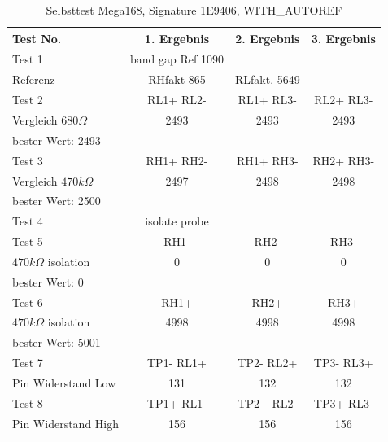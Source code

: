 \begin{table}[H]
  \begin{center}
    \begin{tabular}{| l | c | c | c |}
    \hline
Test No. & 1. Ergebnis & 2. Ergebnis & 3. Ergebnis \\
    \hline
    \hline
Test 1 & band gap Ref  1090 &  & \\
Referenz  & RHfakt 865 & RLfakt.  5649 &  \\
    \hline
Test 2 & RL1+ RL2- & RL1+ RL3- & RL2+ RL3- \\
Vergleich \(680\Omega\) & 2493 & 2493 & 2493 \\
bester Wert: 2493 & & & \\
    \hline
Test 3 & RH1+ RH2- & RH1+ RH3- & RH2+ RH3- \\
Vergleich \(470k\Omega\) & 2497 & 2498 & 2498 \\
bester Wert: 2500 & & & \\
    \hline
Test 4 & isolate probe & & \\
    \hline
Test 5 & RH1- &  RH2- & RH3- \\
\(470k\Omega\) isolation & 0 & 0 & 0 \\
bester Wert: 0 & & & \\
    \hline
Test 6 & RH1+ & RH2+ & RH3+ \\
\(470k\Omega\) isolation & 4998 & 4998 & 4998 \\
bester Wert: 5001 & & & \\
    \hline
Test 7 & TP1- RL1+ & TP2- RL2+ & TP3- RL3+ \\
Pin Widerstand Low & 131 & 132 & 132 \\
    \hline
Test 8 & TP1+ RL1- & TP2+ RL2- & TP3+ RL3- \\
Pin Widerstand High & 156 & 156 & 156 \\
    \hline
    \end{tabular}
  \end{center}
  \caption{Selbsttest Mega168, Signature 1E9406, WITH\_AUTOREF}
  \label{tab:test_m168} 
\end{table}
